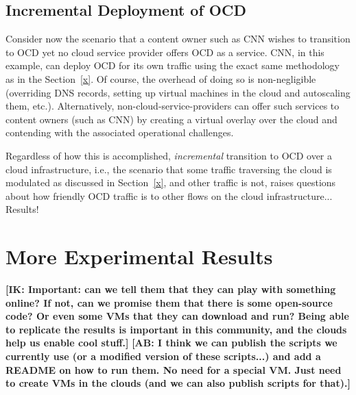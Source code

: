 \documentclass[10pt,sigconf]{acmart}
\newcommand{\mycomm}[3]{{\color{#2} \textbf{[#1: #3]}}}
\newcommand{\mycomm}[3]{}
\newcommand{\IK}[1]{\mycomm{IK}{blue}{#1}}
\newcommand{\AB}[1]{\mycomm{AB}{orange}{#1}}
\begin{document}
\subsection{Incremental Deployment of OCD}

Consider now the scenario that a content owner such as CNN wishes to transition to OCD yet no cloud service provider offers OCD as a service. CNN, in this example, can deploy OCD for its own traffic using the exact same methodology as in the Section~\ref{x}. Of course, the overhead of doing so is non-negligible (overriding DNS records, setting up virtual machines in the cloud and autoscaling them, etc.). Alternatively, non-cloud-service-providers can offer such services to content owners (such as CNN) by creating a virtual overlay over the cloud and contending with the associated operational challenges.

Regardless of how this is accomplished, \emph{incremental} transition to OCD over a cloud infrastructure, i.e., the scenario that some traffic traversing the cloud is modulated as discussed in Section~\ref{x}, and other traffic is not, raises questions about how friendly OCD traffic is to other flows on the cloud infrastructure... Results!


\section{More Experimental Results}

\IK{Important: can we tell them that they can play with something online? If not, can we promise them that there is some open-source code? Or even some VMs that they can download and run? Being able to replicate the results is important in this community, and the clouds help us  enable cool stuff.}
\AB{I think we can publish the scripts we currently use (or a modified version of these scripts...) and add a README on how to run them. No need for a special VM. Just need to create VMs in the clouds (and we can also publish scripts for that).}

\end{document}

